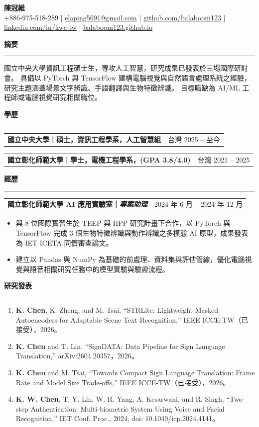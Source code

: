 \documentclass[10pt,a4paper]{article}
\makeatletter
\newcommand{\sectiontitle}[1]{%
  \vspace{5pt}
  {\large\textbf{#1}}\par
  \vspace{-1pt}
  \hrule
  \vspace{2pt}
}
\newcommand{\cventryshort}[2]{%
  \begin{tabularx}{\textwidth}{@{}Xr@{}}
    {\small\textbf{#1}} & {\small{#2}} \\
  \end{tabularx}
  \par
}
\newcommand{\educationentry}[2]{%
  \begin{tabularx}{\textwidth}{@{}Xr@{}}
    {\small\textbf{#1}} & {\small{#2}} \\
  \end{tabularx}
  \par
}
\makeatother
\begin{document}
\begin{center}
  {\LARGE\textbf{陳冠維}}\\[2pt]
  \small
  +886-975-518-289 \;|\;
  \href{mailto:elaping5691@gmail.com}{\uline{elaping5691@gmail.com}} \;|\;
  \href{https://github.com/balaboom123}{\uline{github.com/balaboom123}} \;|\;
  \href{https://www.linkedin.com/in/kwc-tw/}{\uline{linkedin.com/in/kwc-tw}} \;|\;
  \href{https://balaboom123.github.io/}{\uline{balaboom123.github.io}}
\end{center}

\sectiontitle{摘要}
國立中央大學資訊工程碩士生，專攻人工智慧，研究成果已發表於三場國際研討會。
具備以 PyTorch 與 TensorFlow 建構電腦視覺與自然語言處理系統之經驗，研究主題涵蓋場景文字辨識、手語翻譯與生物特徵辨識。
目標職缺為 AI/ML 工程師或電腦視覺研究相關職位。

\sectiontitle{學歷}
\educationentry
  {國立中央大學｜碩士，資訊工程學系，人工智慧組}
  {台灣  2025 -- 至今}
\vspace{1pt}
\educationentry
  {國立彰化師範大學｜學士，電機工程學系，(GPA 3.8/4.0)}
  {台灣  2021 -- 2025}

\sectiontitle{經歷}
\cventryshort
  {國立彰化師範大學 AI 應用實驗室｜\textit{專案助理}}
  {2024 年 6 月 -- 2024 年 12 月}
\begin{itemize}
  \item 與 8 位國際實習生於 TEEP 與 IIPP 研究計畫下合作，以 PyTorch 與 TensorFlow 完成 3 個生物特徵辨識與動作辨識之多模態 AI 原型，成果發表為 IET ICETA 同儕審查論文。
  \item 建立以 Pandas 與 NumPy 為基礎的前處理、資料集與評估管線，優化電腦視覺與語音相關研究任務中的模型實驗與驗證流程。
\end{itemize}

\sectiontitle{研究發表}
\begin{enumerate}[label={\arabic*.}]
  \item \textbf{K. Chen}, K. Zheng, and M. Tsai, ``STRLite: Lightweight Masked Autoencoders for Adaptable Scene Text Recognition,'' IEEE ICCE-TW（已接受），2026。
  \item \textbf{K. Chen} and T. Lin, ``SignDATA: Data Pipeline for Sign Language Translation,'' arXiv:2604.20357，2026。
  \item \textbf{K. Chen} and M. Tsai, ``Towards Compact Sign Language Translation: Frame Rate and Model Size Trade-offs,'' IEEE ICCE-TW（已接受），2026。
  \item \textbf{K. W. Chen}, T. Y. Lin, W. R. Yang, A. Kesarwani, and R. Singh, ``Two-step Authentication: Multi-biometric System Using Voice and Facial Recognition,'' IET Conf. Proc., 2024, doi: 10.1049/icp.2024.4141。
\end{enumerate}
\end{document}
